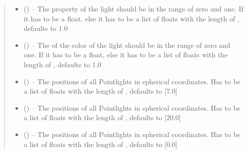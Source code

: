 \documentclass[letterpaper,10pt,english]{sphinxmanual}
\begin{document}
\begin{fulllineitems}
\begin{fulllineitems}
\begin{quote}
\begin{description}
\begin{itemize}
\item {} 
 (\sphinxstyleliteralemphasis{\sphinxupquote{, }}) -- The  property of the light should be in the range of zero and one. If  it has to be a float, else it has to be a list of floats with the length of , defaults to 1.0

\item {} 
 (\sphinxstyleliteralemphasis{\sphinxupquote{, }}) -- The  of the color of the light should be in the range of zero and one. If  it has to be a float, else it has to be a list of floats with the length of , defaults to 1.0

\item {} 
 (\sphinxstyleliteralemphasis{\sphinxupquote{, }}) -- The positions of all Pointlights in spherical coordinates. Has to be a list of floats with the length of , defaults to {[}7.0{]}

\item {} 
 (\sphinxstyleliteralemphasis{\sphinxupquote{, }}) -- The positions of all Pointlights in spherical coordinates. Has to be a list of floats with the length of , defaults to {[}20.0{]}

\item {} 
 (\sphinxstyleliteralemphasis{\sphinxupquote{, }}) -- The positions of all Pointlights in spherical coordinates. Has to be a list of floats with the length of , defaults to {[}0.0{]}


\end{itemize}
\end{description}
\end{quote}
\end{fulllineitems}
\end{fulllineitems}
\end{document}
